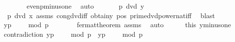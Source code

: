 \begin{isabellebody}
\ \ \ \ \ \ \isamarkupfalse%
\ even{\isacharunderscore}{\kern0pt}p{\isacharunderscore}{\kern0pt}minus{\isacharunderscore}{\kern0pt}one\ \isamarkupfalse%
\ auto\isanewline
\isanewline
\ \ \ \ \isamarkupfalse%
\ {\isachardoublequoteopen}{\isasymnot}\ p\ dvd\ y{\isachardoublequoteclose}\ \isanewline
\ \ \ \ \ \ \isamarkupfalse%
\ {\isacartoucheopen}{\isasymnot}\ p\ dvd\ x{\isacartoucheclose}\ assms{\isacharparenleft}{\kern0pt}{}{\isacharparenright}{\kern0pt}\ cong{\isacharunderscore}{\kern0pt}dvd{\isacharunderscore}{\kern0pt}iff\ obtain{\isacharunderscore}{\kern0pt}y\ pos{}\ prime{\isacharunderscore}{\kern0pt}dvd{\isacharunderscore}{\kern0pt}power{\isacharunderscore}{\kern0pt}nat{\isacharunderscore}{\kern0pt}iff\ \isamarkupfalse%
\ blast\isanewline
\isanewline
\ \ \ \ \isamarkupfalse%
\ \isamarkupfalse%
\ {\isachardoublequoteopen}{\isacharbrackleft}{\kern0pt}{\isacharparenleft}{\kern0pt}y{\isacharparenright}{\kern0pt}{\isacharcircum}{\kern0pt}{\isacharparenleft}{\kern0pt}p\ {\isacharminus}{\kern0pt}\ {}{\isacharparenright}{\kern0pt}\ {\isacharequal}{\kern0pt}\ {}{\isacharbrackright}{\kern0pt}\ {\isacharparenleft}{\kern0pt}mod\ p{\isacharparenright}{\kern0pt}{\isachardoublequoteclose}\isanewline
\ \ \ \ \ \ \isamarkupfalse%
\ fermat{\isacharunderscore}{\kern0pt}theorem\ assms{\isacharparenleft}{\kern0pt}{}{\isacharparenright}{\kern0pt}\ \isamarkupfalse%
\ auto\isanewline
\ \ \ \ \isamarkupfalse%
\ this\ y{\isacharunderscore}{\kern0pt}minus{\isacharunderscore}{\kern0pt}one\ \isamarkupfalse%
\ contradiction{\isacharcolon}{\kern0pt}\ {\isachardoublequoteopen}{\isacharbrackleft}{\kern0pt}{\isacharparenleft}{\kern0pt}y{\isacharparenright}{\kern0pt}{\isacharcircum}{\kern0pt}{\isacharparenleft}{\kern0pt}p\ {\isacharminus}{\kern0pt}\ {}{\isacharparenright}{\kern0pt}\ {\isacharequal}{\kern0pt}\ {\isacharminus}{\kern0pt}{}{\isacharbrackright}{\kern0pt}\ {\isacharparenleft}{\kern0pt}mod\ p{\isacharparenright}{\kern0pt}\ {\isasymand}\ {\isacharbrackleft}{\kern0pt}{\isacharparenleft}{\kern0pt}y{\isacharparenright}{\kern0pt}{\isacharcircum}{\kern0pt}{\isacharparenleft}{\kern0pt}p\ {\isacharminus}{\kern0pt}\ {}{\isacharparenright}{\kern0pt}\ {\isacharequal}{\kern0pt}\ {}{\isacharbrackright}{\kern0pt}\ {\isacharparenleft}{\kern0pt}mod\ p{\isacharparenright}{\kern0pt}{\isachardoublequoteclose}\ \isamarkupfalse%

\end{isabellebody}
